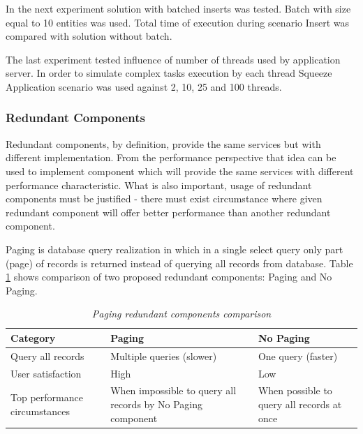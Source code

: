 \documentclass[10pt,a4paper]{article}
\begin{document}
In the next experiment solution with batched inserts was tested. Batch with size equal to 10 entities was used. Total time of execution during scenario Insert was compared with solution without batch. 

The last experiment tested influence of number of threads used by application server. In order to simulate complex tasks execution by each thread Squeeze Application scenario was used against 2, 10, 25 and 100 threads. 

\subsubsection{Redundant Components}
Redundant components, by definition, provide the same services but with different implementation. From the performance perspective that idea can be used to implement component which will provide the same services with different performance characteristic. What is also important, usage of redundant components must be justified - there must exist circumstance where given redundant component will offer better performance than another redundant component. 

Paging is database query realization in which in a single select query only part (page) of records is returned instead of querying all records from database. Table \ref{pagingcomponents} shows comparison of two proposed redundant components: Paging and No Paging.  
\begin{table}[!htb]
\def\arraystretch{1.5}
\caption{\textit{Paging redundant components comparison}}\label{pagingcomponents}
\begin{tabularx}{\textwidth}{p{3cm}|X|X}
  \textbf{Category} &\textbf{Paging} & \textbf{No Paging} \\
\hline
Query all records & Multiple queries (slower) & One query (faster) \\
User satisfaction & High & Low\\
Top performance circumstances & When impossible to query all records by No Paging component & When possible to query all records at once\\
\end{tabularx}
\end{table}
\end{document}
